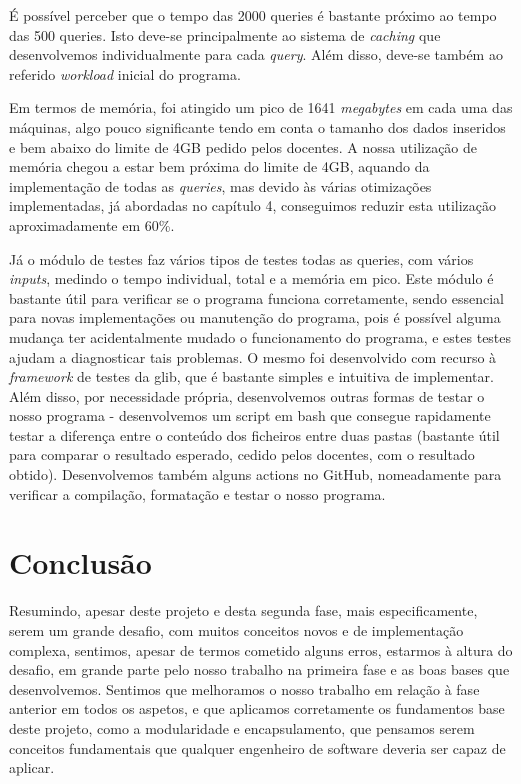 \documentclass[12pt,a4paper]{report}
\begin{document}
    \par É possível perceber que o tempo das 2000 queries é bastante próximo ao tempo das 500 queries. Isto deve-se principalmente ao sistema de \textit{caching} que desenvolvemos individualmente para cada \textit{query}. Além disso, deve-se também ao referido \textit{workload} inicial do programa.
 
    \par Em termos de memória, foi atingido um pico de 1641 \textit{megabytes} em cada uma das máquinas, algo pouco significante tendo em conta o tamanho dos dados inseridos e bem abaixo do limite de 4GB pedido pelos docentes. A nossa utilização de memória chegou a estar bem próxima do limite de 4GB, aquando da implementação de todas as \textit{queries}, mas devido às várias otimizações implementadas, já abordadas no capítulo 4, conseguimos reduzir esta utilização aproximadamente em 60\%.
    \par Já o módulo de testes faz vários tipos de testes todas as queries, com vários \textit{inputs}, medindo o tempo individual, total e a memória em pico. Este módulo é bastante útil para verificar se o programa funciona corretamente, sendo essencial para novas implementações ou manutenção do programa, pois é possível alguma mudança ter acidentalmente mudado o funcionamento do programa, e estes testes ajudam a diagnosticar tais problemas. O mesmo foi desenvolvido com recurso à \textit{framework} de testes da glib, que é bastante simples e intuitiva de implementar. Além disso, por necessidade própria, desenvolvemos outras formas de testar o nosso programa - desenvolvemos um script em bash que consegue rapidamente testar a diferença entre o conteúdo dos ficheiros entre duas pastas (bastante útil para comparar o resultado esperado, cedido pelos docentes, com o resultado obtido). Desenvolvemos também alguns actions no GitHub, nomeadamente para verificar a compilação, formatação e testar o nosso programa.
    
\newpage

    \chapter{Conclusão}
    
    \par Resumindo, apesar deste projeto e desta segunda fase, mais especificamente, serem um grande desafio, com muitos conceitos novos e de implementação complexa, sentimos, apesar de termos cometido alguns erros, estarmos à altura do desafio, em grande parte pelo nosso trabalho na primeira fase e as boas bases que desenvolvemos. Sentimos que melhoramos o nosso trabalho em relação à fase anterior em todos os aspetos, e que aplicamos corretamente os fundamentos base deste projeto, como a modularidade e encapsulamento, que pensamos serem conceitos fundamentais que qualquer engenheiro de software deveria ser capaz de aplicar.
\end{document}

